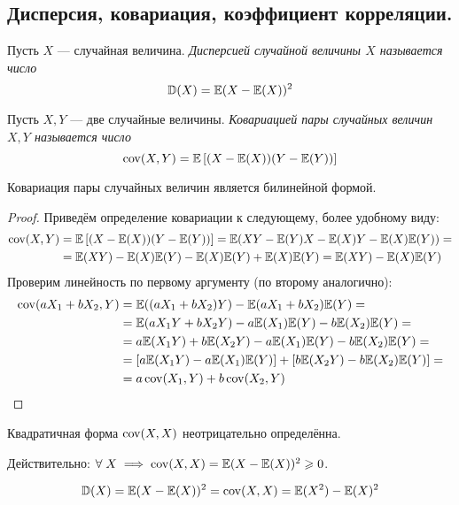 \subsection{Дисперсия, ковариация, коэффициент корреляции.}
\begin{definition}
    Пусть $X$ --- случайная величина. \it{Дисперсией} случайной величины $X$ называется число
    \[
        \mathbb{D}(X) = \mathbb{E}(X - \mathbb{E}(X))^2
    \]
\end{definition}
\begin{definition}
    Пусть $X, Y$ --- две случайные величины. \it{Ковариацией} пары случайных величин $X, Y$ называется число
    \[
        \operatorname{\mathop{\mathrm{cov}}}(X, Y) = \mathbb{E}\left[ (X - \mathbb{E}(X))(Y - \mathbb{E}(Y)) \right]
    \]
\end{definition}
\begin{proposal}
    Ковариация пары случайных величин является билинейной формой.
\end{proposal}
\begin{proof}
    Приведём определение ковариации к следующему, более удобному виду:
    \begin{align*}
        \operatorname{\mathop{\mathrm{cov}}}(X, Y) &= \mathbb{E}\left[ (X - \mathbb{E}(X))(Y - \mathbb{E}(Y)) \right] =
        \mathbb{E}(XY - \mathbb{E}(Y)X - \mathbb{E}(X)Y - \mathbb{E}(X)\mathbb{E}(Y)) =\\
        &=\mathbb{E}(XY) - \mathbb{E}(X)\mathbb{E}(Y) - \mathbb{E}(X)\mathbb{E}(Y) + \mathbb{E}(X)\mathbb{E}(Y) =
        \mathbb{E}(XY) - \mathbb{E}(X)\mathbb{E}(Y)
    \end{align*}
    Проверим линейность по первому аргументу (по второму аналогично):
    \begin{align*}
        \operatorname{\mathop{\mathrm{cov}}}(aX_1 + bX_2, Y) & = \mathbb{E}((aX_1 + bX_2)Y) - \mathbb{E}(aX_1 + bX_2)\mathbb{E}(Y) =\\
        &=\mathbb{E}(aX_{1}Y + bX_2Y) - a\mathbb{E}(X_1)\mathbb{E}(Y) - b\mathbb{E}(X_2)\mathbb{E}(Y) =\\
        &=a\mathbb{E}(X_{1}Y) + b\mathbb{E}(X_2Y) - a\mathbb{E}(X_1)\mathbb{E}(Y) - b\mathbb{E}(X_2)\mathbb{E}(Y) =\\
        &=\left[ a\mathbb{E}(X_{1}Y) - a\mathbb{E}(X_1)\mathbb{E}(Y) \right] + \left[ b\mathbb{E}(X_2Y) - b\mathbb{E}(X_2)\mathbb{E}(Y) \right]=\\
        &=a\operatorname{\mathop{\mathrm{cov}}}(X_1, Y) + b\operatorname{\mathop{\mathrm{cov}}}(X_2, Y)
    \end{align*}
\end{proof}
\begin{corollary}
    Квадратичная форма $\operatorname{\mathop{\mathrm{cov}}}(X, X)$ неотрицательно определённа.

    Действительно: $\forall\; X \implies \operatorname{\mathop{\mathrm{cov}}}(X, X) = \mathbb{E}(X - \mathbb{E}(X))^2 \geqslant 0$.
\end{corollary}
\begin{corollary}
    \[
        \mathbb{D}(X) = \mathbb{E}(X - \mathbb{E}(X))^2 = \operatorname{\mathop{\mathrm{cov}}}(X, X) = \mathbb{E}(X^2) - \mathbb{E}(X)^2
    \]
\end{corollary}

